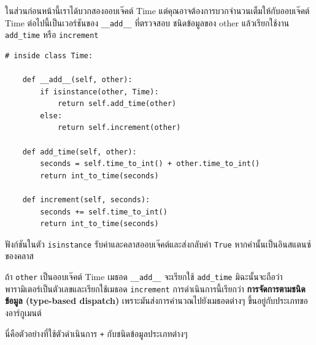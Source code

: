 
ในส่วนก่อนหน้านี้เราได้บวกสองออบเจ๊คต์ Time แต่คุณอาจต้องการบวกจำนวนเต็มให้กับออบเจ๊คต์ Time ต่อไปนี้เป็นเวอร์ชันของ \verb"__add__" ที่ตรวจสอบ
ชนิดข้อมูลของ other แล้วเรียกใช้งาน \verb"add_time" หรือ {\tt increment}

\begin{verbatim}
# inside class Time:

    def __add__(self, other):
        if isinstance(other, Time):
            return self.add_time(other)
        else:
            return self.increment(other)

    def add_time(self, other):
        seconds = self.time_to_int() + other.time_to_int()
        return int_to_time(seconds)

    def increment(self, seconds):
        seconds += self.time_to_int()
        return int_to_time(seconds)
\end{verbatim}
%

ฟังก์ชันในตัว {\tt isinstance} รับค่าและคลาสออบเจ๊คต์และส่งกลับค่า {\tt True} หากค่านั้นเป็นอินสแตนซ์ของคลาส


ถ้า {\tt other} เป็นออบเจ๊คต์ Time เมธอด \verb"__add__" จะเรียกใช้ \verb"add_time" 
มิฉะนั้นจะถือว่าพารามิเตอร์เป็นตัวเลขและเรียกใช้เมธอด {\tt increment}  การดำเนินการนี้เรียกว่า {\bf การจัดการตามชนิดข้อมูล  (type-based dispatch)}
เพราะมันส่งการคำนวณไปยังเมธอดต่างๆ ขึ้นอยู่กับประเภทของอาร์กูเมนต์


นี่คือตัวอย่างที่ใช้ตัวดำเนินการ {\tt +} กับชนิดข้อมูลประเภทต่างๆ

